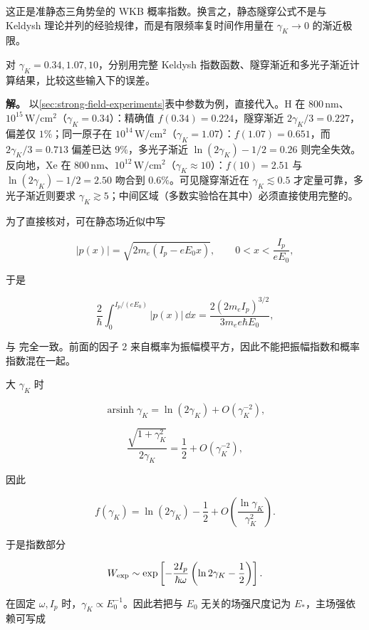 这正是准静态三角势垒的 WKB 概率指数。换言之，静态隧穿公式不是与 Keldysh 理论并列的经验规律，而是有限频率复时间作用量在 \(\gamma_K\to0\) 的渐近极限。

\begin{exbox}
对 $\gamma_K=0.34,1.07,10$，分别用完整 Keldysh 指数函数、隧穿渐近和多光子渐近计算结果，比较这些输入下的误差。

\textbf{解。} 以\cref{sec:strong-field-experiments}表中参数为例，直接代入。H 在 800\,nm、\(10^{15}\,\mathrm{W/cm^2}\)（\(\gamma_K=0.34\)）：精确值 \(f(0.34)=0.224\)，隧穿渐近 \(2\gamma_K/3=0.227\)，偏差仅 \(1\%\)；同一原子在 \(10^{14}\,\mathrm{W/cm^2}\)（\(\gamma_K=1.07\)）：\(f(1.07)=0.651\)，而 \(2\gamma_K/3=0.713\) 偏差已达 \(9\%\)，多光子渐近 \(\ln(2\gamma_K)-1/2=0.26\) 则完全失效。反向地，Xe 在 800\,nm、\(10^{12}\,\mathrm{W/cm^2}\)（\(\gamma_K\approx10\)）：\(f(10)=2.51\) 与 \(\ln(2\gamma_K)-1/2=2.50\) 吻合到 \(0.6\%\)。可见隧穿渐近在 \(\gamma_K\lesssim0.5\) 才定量可靠，多光子渐近则要求 \(\gamma_K\gtrsim5\)；中间区域（多数实验恰在其中）必须直接使用完整的。
\end{exbox}

为了直接核对，可在静态场近似中写

\[
|p(x)|=\sqrt{2m_e(I_p-eE_0x)},
\qquad
0<x<\frac{I_p}{eE_0},
\]

于是

\[
\frac{2}{\hbar}\int_0^{I_p/(eE_0)}|p(x)|\,\dd x
=
\frac{2(2m_eI_p)^{3/2}}{3m_e e\hbar E_0},
\]

与  完全一致。前面的因子 2 来自概率为振幅模平方，因此不能把振幅指数和概率指数混在一起。



大 \(\gamma_K\) 时

\[
\operatorname{arsinh}\gamma_K
=\ln(2\gamma_K)+O(\gamma_K^{-2}),
\]

\[
\frac{\sqrt{1+\gamma_K^2}}{2\gamma_K}
=\frac12+O(\gamma_K^{-2}),
\]

因此

\[
f(\gamma_K)
=\ln(2\gamma_K)-\frac12
+O\!\left(\frac{\ln\gamma_K}{\gamma_K^2}\right).
\]

于是指数部分

\[
W_{\rm exp}
\sim
\exp\left[
-\frac{2I_p}{\hbar\omega}
\left(\ln2\gamma_K-\frac12\right)
\right].
\]

在固定 \(\omega,I_p\) 时，\(\gamma_K\propto E_0^{-1}\)。因此若把与 \(E_0\) 无关的场强尺度记为 \(E_*\)，主场强依赖可写成

